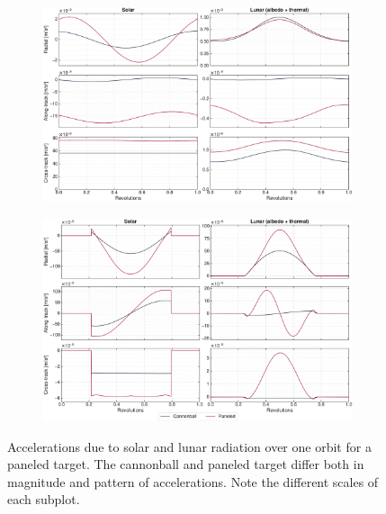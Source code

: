 \begin{figure}[t]
    \centering
    \begin{subfigure}[c]{\textwidth}
        \includegraphics[width=\textwidth]{figures/plots/acc_solarvslunar_jun.pdf}
        \label{fig:acc-solarvslunar-jun}
     \end{subfigure}

     \bigskip

     \begin{subfigure}[c]{\textwidth}
        \includegraphics[width=\textwidth]{figures/plots/acc_solarvslunar_sep.pdf}
        \label{fig:acc-solarvslunar-sep}
     \end{subfigure}

    \caption{Accelerations due to solar and lunar radiation over one orbit for a paneled target. The cannonball and paneled target differ both in magnitude and pattern of accelerations. Note the different scales of each subplot.}
    \label{fig:acc-solarvslunar}
\end{figure}

